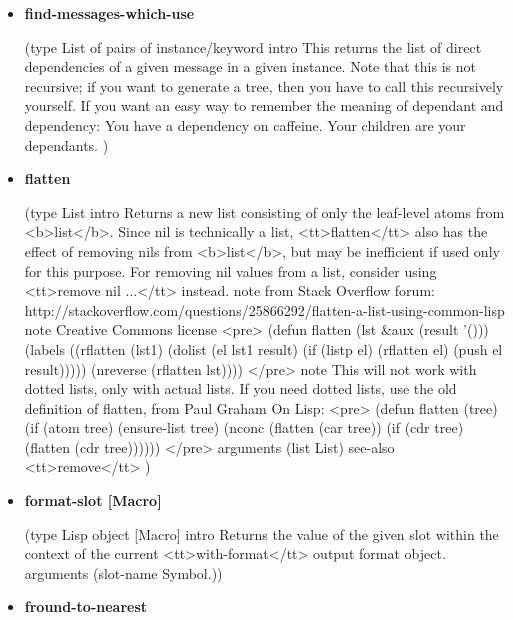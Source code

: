 \documentclass [11pt]{book}
\begin{document}
\begin{itemize}
\item {}
\label{prim:find-messages-which-use}
\textbf{find-messages-which-use}

(type List of pairs of instance/keyword intro
  This returns the list of direct dependencies of a given
message in a given instance. Note that this is not recursive; if you want to generate a tree,
then you have to call this recursively yourself.
If you want an easy way to remember the meaning of dependant and dependency:
You have a dependency on caffeine. Your children are your dependants.
)



\item {}
\label{prim:flatten}
\textbf{flatten}

(type List intro
  Returns a new list consisting of only the leaf-level atoms from <b>list</b>.
Since nil is technically a list, <tt>flatten</tt> also has the effect of removing
nils from <b>list</b>, but may be inefficient if used only for this purpose. For
removing nil values from a list, consider using <tt>remove nil ...</tt> instead.
 note
 from Stack Overflow forum: http://stackoverflow.com/questions/25866292/flatten-a-list-using-common-lisp 
 note Creative Commons license 
<pre>
 (defun flatten (lst \&aux (result '()))
   (labels ((rflatten (lst1)
              (dolist (el lst1 result)
                (if (listp el)
                  (rflatten el)
                  (push el result)))))
       (nreverse (rflatten lst))))
</pre>
 note This will not work with dotted lists, only with actual lists. If 
you need dotted lists, use the old definition of flatten, from Paul
Graham On Lisp:
<pre>
  (defun flatten (tree)
   (if (atom tree)
       (ensure-list tree)
       (nconc (flatten (car tree))
              (if (cdr tree) (flatten (cdr tree))))))
</pre>
 arguments (list List) see-also <tt>remove</tt> 
)



\item {}
\label{prim:format-slot}
\textbf{format-slot [Macro]}

(type Lisp object [Macro] intro
  Returns the value of the given slot within the context of the current
<tt>with-format</tt> output format object.
 arguments (slot-name Symbol.))



\item {}
\label{prim:fround-to-nearest}
\textbf{fround-to-nearest}


\end{itemize}
\end{document}
